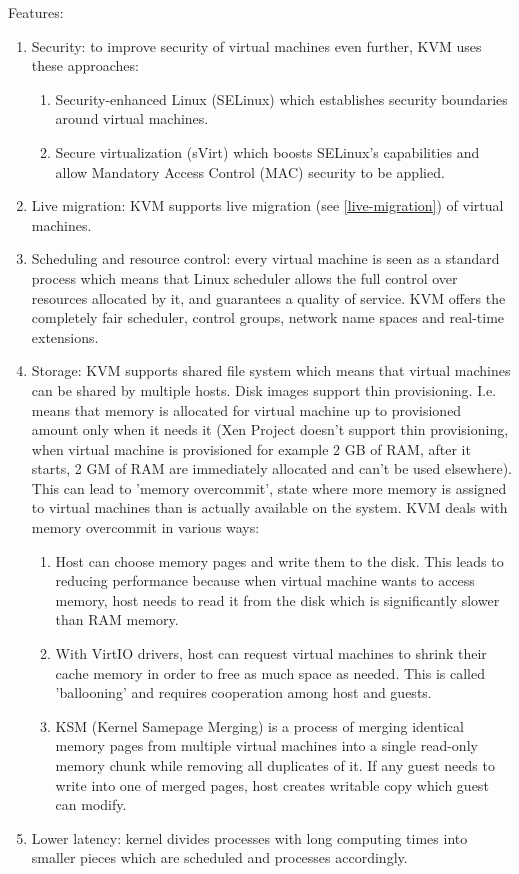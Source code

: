 Features:
\begin{enumerate}
\item Security: to improve security of virtual machines even further, KVM uses these approaches:
\begin{enumerate}
\item Security-enhanced Linux (SELinux) which establishes security boundaries around virtual machines.
\item Secure virtualization (sVirt) which boosts SELinux's capabilities and allow Mandatory Access Control (MAC) security to be applied.
\end{enumerate}
\item Live migration: KVM supports live migration (see \ref{live-migration}) of virtual machines.
\item Scheduling and resource control: every virtual machine is seen as a standard process which means that Linux scheduler allows the full control over resources allocated by it, and guarantees a quality of service. KVM offers the completely fair scheduler, control groups, network name spaces and real-time extensions.
\item Storage: KVM supports shared file system which means that virtual machines can be shared by multiple hosts. Disk images support thin provisioning. I.e. means that memory is allocated for virtual machine up to provisioned amount only when it needs it (Xen Project doesn't support thin provisioning, when virtual machine is provisioned for example 2 GB of RAM, after it starts, 2 GM of RAM are immediately allocated and can't be used elsewhere). This can lead to 'memory overcommit', state where more memory is assigned to virtual machines than is actually available on the system. KVM deals with memory overcommit in various ways:
\begin{enumerate}
\item Host can choose memory pages and write them to the disk. This leads to reducing performance because when virtual machine wants to access memory, host needs to read it from the disk which is significantly slower than RAM memory.
\item With VirtIO drivers, host can request virtual machines to shrink their cache memory in order to free as much space as needed. This is called 'ballooning' and requires cooperation among host and guests.
\item KSM (Kernel Samepage Merging) is a process of merging identical memory pages from multiple virtual machines into a single read-only memory chunk while removing all duplicates of it. If any guest needs to write into one of merged pages, host creates writable copy which guest can modify.
\end{enumerate}
\item Lower latency: kernel divides processes with long computing times into smaller pieces which are scheduled and processes accordingly.
\end{enumerate}


